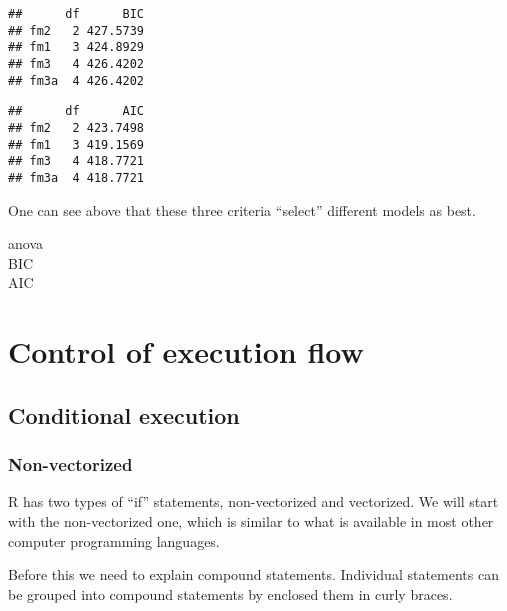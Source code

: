 \documentclass[paper=a4,10pt,div=17,headsepline,BCOR=12mm,twoside,open=right]{scrbook}\usepackage{knitr}
\begin{document}
\begin{knitrout}\footnotesize
{}\color{fgcolor}\begin{kframe}
\begin{alltt}
\end{alltt}
\begin{verbatim}
##      df      BIC
## fm2   2 427.5739
## fm1   3 424.8929
## fm3   4 426.4202
## fm3a  4 426.4202
\end{verbatim}
\begin{alltt}
\end{alltt}
\begin{verbatim}
##      df      AIC
## fm2   2 423.7498
## fm1   3 419.1569
## fm3   4 418.7721
## fm3a  4 418.7721
\end{verbatim}
\end{kframe}
\end{knitrout}

One can see above that these three criteria ``select'' different models as best.
\begin{description}
\item[anova] 
\item[BIC] 
\item[AIC] 
\end{description}

\section{Control of execution flow}

\subsection{Conditional execution}

\subsubsection{Non-vectorized}

R has two types of ``if'' statements, non-vectorized and vectorized. We will start with the non-vectorized one, which is similar to what is available in most other computer programming languages.

Before this we need to explain compound statements. Individual statements can be grouped into compound statements by enclosed them in curly braces.
\end{document}
